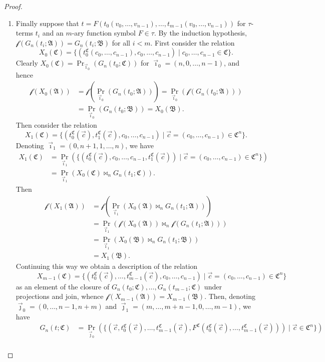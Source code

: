 \documentclass[a4paper]{amsart}
\theoremstyle{definition}
\theoremstyle{remark}
\newcommand{\A}{\mathcal{A}}
\newcommand{\B}{\mathcal{B}}
\newcommand{\C}{\mathcal{C}}
\theoremstyle{definition}
\renewcommand{\A}{\mathfrak{A}}
\renewcommand{\B}{\mathfrak{B}}
\renewcommand{\C}{\mathfrak{C}}
\newcommand{\f}{\mathcal{f}}
\begin{document}
\begin{proof}
\begin{enumerate}
        \item Finally suppose that $t = F(t_0(v_0,\dots,v_{n-1}),\dots,t_{m-1}(v_0,\dots,v_{n-1}))$ for $\tau$-terms $t_i$ and an $m$-ary function symbol $F\in\tau$. By the induction hypothesis, $\f(G_n(t_i;\A)) = G_n(t_i;\B)$ for all $i<m$. First consider the relation
        \[
            X_0(\C) = \{ (t_0^\C(c_0,\dots,c_{n-1}),c_0,\dots,c_{n-1}) \mid c_0,\dots,c_{n-1}\in\C \}.
        \]
        Clearly $X_0(\C) = \Pr_{\vec\imath_0}(G_n(t_0;\C))$ for $\vec\imath_0 = (n,0,\dots,n-1)$, and hence
        \begin{align*}
            \f(X_0(\A)) &= \f(\Pr_{\vec\imath_0}(G_n(t_0;\A))) = \Pr_{\vec\imath_0}(\f(G_n(t_0;\A))) \\
            &= \Pr_{\vec\imath_0}(G_n(t_0;\B)) = X_0(\B).
        \end{align*}
        Then consider the relation
        \[
            X_1(\C) = \{ (t_0^\C(\vec c),t_1^\C(\vec c),c_0,\dots,c_{n-1}) \mid \vec c = (c_0,\dots,c_{n-1})\in\C^n \}.
        \]
        Denoting $\vec\imath_1 = (0,n+1,1,\dots,n)$, we have
        \begin{align*}
            X_1(\C) &= \Pr_{\vec\imath_1}( \{ (t_0^\C(\vec c),c_0,\dots,c_{n-1},t_1^\C(\vec c)) \mid \vec c = (c_0,\dots,c_{n-1})\in\C^n \} ) \\
            &= \Pr_{\vec\imath_1}( X_0(\C) \bowtie_n G_n(t_1;\C) ).
        \end{align*}
        Then
        \begin{align*}
            \f(X_1(\A)) &= \f(\Pr_{\vec\imath_1}( X_0(\A) \bowtie_n G_n(t_1;\A) )) \\
            &= \Pr_{\vec\imath_1}( \f(X_0(\A)) \bowtie_n \f(G_n(t_1;\A)) ) \\
            &= \Pr_{\vec\imath_1}( X_0(\B) \bowtie_n G_n(t_1;\B) ) \\
            &= X_1(\B).
        \end{align*}
        Continuing this way we obtain a description of the relation
        \[
            \hspace{3em} X_{m-1}(\C) = \{ (t_0^\C(\vec c),\dots,t_{m-1}^\C(\vec c),c_0,\dots,c_{n-1}) \mid \vec c = (c_0,\dots,c_{n-1})\in\C^n \}
        \]
        as an element of the closure of $G_n(t_0;\C),\dots,G_n(t_{m-1};\C)$ under projections and join, whence $\f(X_{m-1}(\A)) = X_{m-1}(\B)$. Then, denoting $\vec\jmath_0 = (0,\dots,n-1,n+m)$ and $\vec\jmath_1 = (m,\dots,m+n-1,0,\dots,m-1)$, we have
        \begin{align*}
            \hspace{3em} G_n(t;\C) &= \Pr_{\vec\jmath_0}\left( \{ (\vec c,t_0^\C(\vec c),\dots,t_{m-1}^\C(\vec c),F^\C(t_0^\C(\vec c),\dots,t_{m-1}^\C(\vec c))) \mid \vec c\in\C^n \} \right) \\

\end{align*}
\end{enumerate}
\end{proof}
\end{document}
